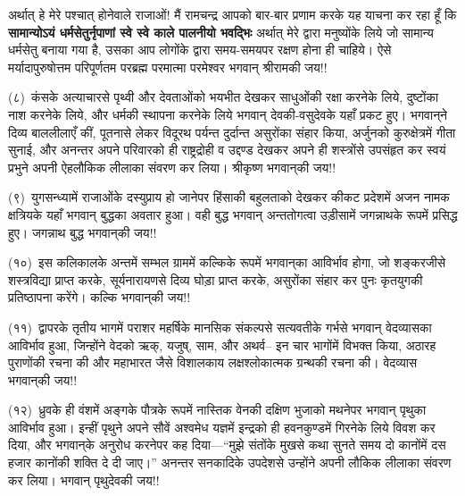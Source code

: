 \begin{sloppypar}\justifying{}
अर्थात् हे मेरे पश्चात् होनेवाले राजाओं! मैं रामचन्द्र आपको बार-बार प्रणाम करके यह याचना कर रहा हूँ कि \textbf{सामान्योऽयं धर्मसेतुर्नृपाणां स्वे स्वे काले पालनीयो भवद्भिः} अर्थात् मेरे द्वारा मनुष्योंके लिये जो सामान्य धर्मसेतु बनाया गया है, उसका आप लोगोंके द्वारा समय-समयपर रक्षण होना ही चाहिये। ऐसे मर्यादा\-पुरुषोत्तम परिपूर्णतम परब्रह्म परमात्मा परमेश्वर भगवान् श्रीरामकी जय!!
\end{sloppypar}
\begin{sloppypar}\justifying{}
(८)~कंसके अत्याचारसे पृथ्वी और देवताओंको भयभीत देखकर साधुओंकी रक्षा करनेके लिये, दुष्टोंका नाश करनेके लिये, और धर्मकी स्थापना करनेके लिये भगवान् देवकी-वसुदेवके यहाँ प्रकट हुए। भगवान्‌ने दिव्य बाल\-लीलाएँ कीं, पूतनासे लेकर विदूरथ पर्यन्त दुर्दान्त असुरोंका संहार किया, अर्जुनको कुरुक्षेत्रमें गीता सुनाई, और अनन्तर अपने परिवारको ही राष्ट्रद्रोही व उद्दण्ड देखकर अपने ही शस्त्रोंसे उपसंहृत कर स्वयं प्रभुने अपनी ऐहलौकिक लीलाका संवरण कर लिया। श्रीकृष्ण भगवान्‌की जय!!
\end{sloppypar}
\begin{sloppypar}\justifying{}
(९)~युगसन्ध्यामें राजाओंके दस्युप्राय हो जानेपर हिंसाकी बहुलताको देखकर कीकट प्रदेशमें अजन नामक क्षत्रियके यहाँ भगवान् बुद्धका अवतार हुआ। वही बुद्ध भगवान् अन्ततोगत्वा उड़ीसामें जगन्नाथके रूपमें प्रसिद्ध हुए। जगन्नाथ बुद्ध भगवान्‌की जय!!
\end{sloppypar}
\begin{sloppypar}\justifying{}
(१०)~इस कलिकालके अन्तमें सम्भल ग्राममें कल्किके रूपमें भगवान्‌का आविर्भाव होगा, जो शङ्करजीसे शस्त्रविद्या प्राप्त करके, सूर्यनारायणसे दिव्य घोड़ा प्राप्त करके, असुरोंका संहार कर पुनः कृतयुगकी प्रतिष्ठापना करेंगे। कल्कि भगवान्‌की जय!!
\end{sloppypar}
\begin{sloppypar}\justifying{}
(११)~द्वापरके तृतीय भागमें पराशर महर्षिके मानसिक संकल्पसे सत्यवतीके गर्भसे भगवान् वेदव्यासका आविर्भाव हुआ, जिन्होंने वेदको ऋक्, यजुष्, साम, और अथर्व– इन चार भागोंमें विभक्त किया, अठारह पुराणोंकी रचना की और महाभारत जैसे विशालकाय लक्ष\-श्लोकात्मक ग्रन्थकी रचना की। वेदव्यास भगवान्‌की जय!!
\end{sloppypar}
\begin{sloppypar}\justifying{}
(१२)~ध्रुवके ही वंशमें अङ्गके पौत्रके रूपमें नास्तिक वेनकी दक्षिण भुजाको मथनेपर भगवान् पृथुका आविर्भाव हुआ। इन्हीं पृथुने अपने सौवें अश्वमेध यज्ञमें इन्द्रको ही हवनकुण्डमें गिरनेके लिये विवश कर दिया, और भगवान्‌के अनुरोध करनेपर कह दिया—“मुझे संतोंके मुखसे कथा सुनते समय दो कानोंमें दस हजार कानोंकी शक्ति दे दी जाए।” अनन्तर सनकादिके उपदेशसे उन्होंने अपनी लौकिक लीलाका संवरण कर लिया। भगवान् पृथुदेवकी जय!!
\end{sloppypar}
